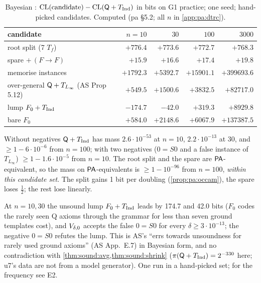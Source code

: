 \begin{table}[t]\centering\footnotesize
\begin{tabular}{@{}lrrrr@{}}
\toprule
candidate & $n=10$ & $30$ & $100$ & $3000$\\
\midrule
root split (7 $T_f$) & $+776.4$ & $+773.6$ & $+772.7$ & $+768.3$\\
spare $+\,(F\to F)$ & $+15.9$ & $+16.6$ & $+17.4$ & $+19.8$\\
memorise instances & $+1792.3$ & $+5392.7$ & $+15901.1$ & $+399693.6$\\
over-general $\mathsf{Q}+T_{L_\infty}$ (AS Prop 5.12) & $+549.5$ & $+1500.6$ & $+3832.5$ & $+82717.0$\\
lump $F_0+T_{\mathrm{Ind}}$ & $-174.7$ & $-42.0$ & $+319.3$ & $+8929.8$\\
bare $F_0$ & $+584.0$ & $+2148.6$ & $+6067.9$ & $+137387.5$\\
\bottomrule
\end{tabular}
\caption{Bayesian \DTRC{}: $\mathrm{CL}(\text{candidate})-\mathrm{CL}(\mathsf{Q}+T_{\mathrm{Ind}})$ in bits on G1 practice; one seed; hand-picked candidates. Computed (pa \S5.2; all $n$ in \cref{app:pa:dtrc}).}\label{tab:pa:dtrc}
\end{table}

\noindent Without negatives $\mathsf{Q}+T_{\mathrm{Ind}}$ has mass $2.6\cdot10^{-53}$ at $n=10$, $2.2\cdot10^{-13}$ at $30$, and $\ge1-6\cdot10^{-6}$ from $n=100$; with two negatives ($0=S0$ and a false instance of $T_{L_\infty}$) $\ge1-1.6\cdot10^{-5}$ from $n=10$. The root split and the spare are $\mathsf{PA}$-equivalent, so the mass on $\mathsf{PA}$-equivalents is $\ge1-10^{-96}$ from $n=100$, \emph{within this candidate set}. The split gains 1 bit per doubling (\cref{prop:pa:occam}), the spare loses $\frac12$; the rest lose linearly.

\begin{remark}\pabrk{}\label{rem:pa:lumps}
At $n=10,30$ the unsound lump $F_0+T_{\mathrm{Ind}}$ leads by 174.7 and 42.0 bits ($F_0$ codes the rarely seen Q axioms through the grammar for less than seven ground templates cost), and $V_{\delta,0}$ accepts the false $0=S0$ for every $\delta\ge3\cdot10^{-13}$; the negative $0=S0$ refutes the lump. This is AS's ``errs towards unsoundness for rarely used ground axioms'' (AS App.~E.7) in Bayesian form, and no contradiction with \cref{thm:sound:avg,thm:sound:shrink} ($\pi(\mathsf{Q}+T_{\mathrm{Ind}})=2^{-330}$ here; u7's data are not from a model generator). One run in a hand-picked set; for the frequency see E2.
\end{remark}

